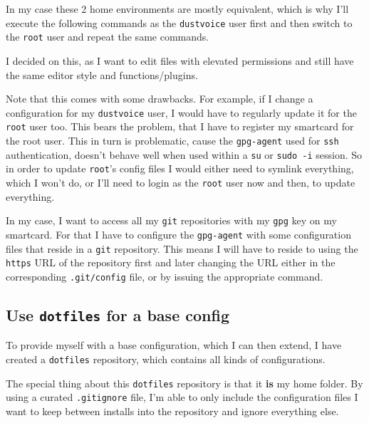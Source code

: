 \documentclass[9pt]{report}
\newenvironment{NOTE}
{\begin{tcolorbox}[colback=admonitionBG,coltitle=draculaFG,colframe=draculaBlue,colbacktitle=draculaBlue,title=NOTE]}
{\end{tcolorbox}}
\begin{document}
\begin{NOTE}
    In my case these 2 home environments are mostly equivalent, which is why I’ll execute the following commands as the \texttt{dustvoice} user first and then switch to the \texttt{root} user and repeat the same commands.


    I decided on this, as I want to edit files with elevated permissions and still have the same editor style and functions/plugins.


    Note that this comes with some drawbacks.
    For example, if I change a configuration for my \texttt{dustvoice} user, I would have to regularly update it for the \texttt{root} user too.
    This bears the problem, that I have to register my smartcard for the root user.
    This in turn is problematic, cause the \texttt{gpg-agent} used for \texttt{ssh} authentication, doesn’t behave well when used within a \texttt{su} or \texttt{sudo -i} session.
    So in order to update \texttt{root}'s config files I would either need to symlink everything, which I won’t do, or I’ll need to login as the \texttt{root} user now and then, to update everything.

\end{NOTE}
\begin{NOTE}
    In my case, I want to access all my \texttt{git} repositories with my \texttt{gpg} key on my smartcard.
    For that I have to configure the \texttt{gpg-agent} with some configuration files that reside in a \texttt{git} repository.
    This means I will have to reside to using the \texttt{https} URL of the repository first and later changing the URL either in the corresponding \texttt{.git/config} file, or by issuing the appropriate command.

\end{NOTE}

\newpage

\hypertarget{x-use-dotfiles-for-a-base-config}{\subsection{Use \texttt{dotfiles} for a base config}}
To provide myself with a base configuration, which I can then extend, I have created a \texttt{dotfiles} repository, which contains all kinds of configurations.


The special thing about this \texttt{dotfiles} repository is that it \textbf{is} my home folder.
By using a curated \texttt{.gitignore} file, I’m able to only include the configuration files I want to keep between installs into the repository and ignore everything else.
\end{document}
